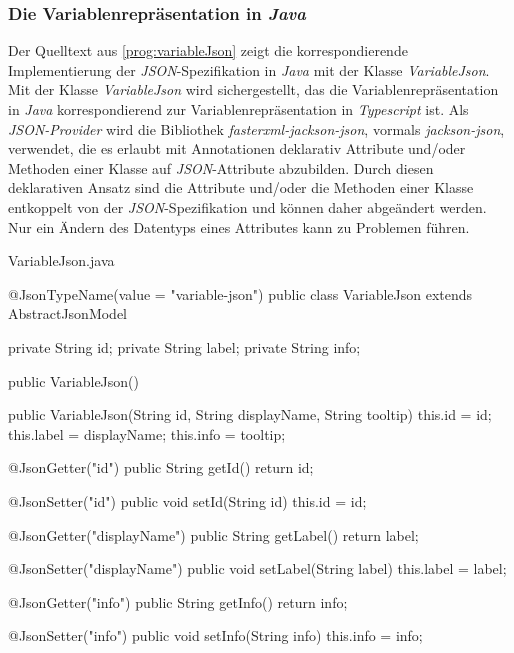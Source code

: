 \subsubsection{Die Variablenrepräsentation in \emph{Java}}
Der Quelltext aus \ref{prog:variableJson} zeigt die korrespondierende Implementierung der \emph{JSON}-Spezifikation in \emph{Java} mit der Klasse \emph{VariableJson}. Mit der Klasse \emph{VariableJson} wird sichergestellt, das die Variablenrepräsentation in \emph{Java} korrespondierend zur Variablenrepräsentation in \emph{Typescript} ist. Als \emph{JSON-Provider} wird die Bibliothek \emph{fasterxml-jackson-json}, vormals \emph{jackson-json}, verwendet, die es erlaubt mit Annotationen deklarativ Attribute und/oder Methoden einer Klasse auf \emph{JSON}-Attribute abzubilden. Durch diesen deklarativen Ansatz sind die Attribute und/oder die Methoden einer Klasse entkoppelt von der \emph{JSON}-Spezifikation und können daher abgeändert werden. Nur ein Ändern des Datentyps eines Attributes kann zu Problemen führen. 
\begin{program}[h]
\caption{VariableJson.java}
\label{prog:variableJson}
\begin{JsCode}
@JsonTypeName(value = "variable-json")
public class VariableJson extends AbstractJsonModel {

    private String id;
    private String label;
    private String info;

    public VariableJson() {
    }

    public VariableJson(String id, String displayName, String tooltip) {
        this.id = id;
        this.label = displayName;
        this.info = tooltip;
    }

    @JsonGetter("id")
    public String getId() { return id; }

    @JsonSetter("id")
    public void setId(String id) { this.id = id; }

    @JsonGetter("displayName")
    public String getLabel() { return label; }

    @JsonSetter("displayName")
    public void setLabel(String label) { this.label = label; }

    @JsonGetter("info")
    public String getInfo() { return info; }

    @JsonSetter("info")
    public void setInfo(String info) { this.info = info; }
}
\end{JsCode}
\end{program}
\ \newpage


